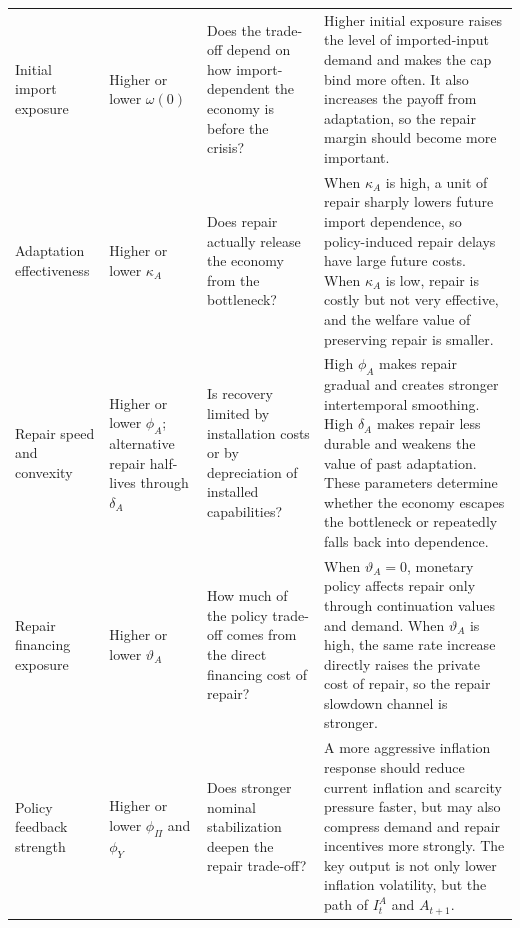 ﻿\documentclass[12pt]{article}
\theoremstyle{remark}
\begin{document}
\begin{longtable}{
>{\raggedright\arraybackslash}p{}
>{\raggedright\arraybackslash}p{}
>{\raggedright\arraybackslash}p{}
>{\raggedright\arraybackslash}p{}}
Initial import exposure
&
Higher or lower $\omega(0)$
&
Does the trade-off depend on how import-dependent the economy is before the crisis?
&
Higher initial exposure raises the level of imported-input demand and makes the cap bind more
often. It also increases the payoff from adaptation, so the repair margin should become more
important.
\\

Adaptation effectiveness
&
Higher or lower $\kappa_A$
&
Does repair actually release the economy from the bottleneck?
&
When $\kappa_A$ is high, a unit of repair sharply lowers future import dependence, so policy-induced
repair delays have large future costs. When $\kappa_A$ is low, repair is costly but not very
effective, and the welfare value of preserving repair is smaller.
\\

Repair speed and convexity
&
Higher or lower $\phi_A$; alternative repair half-lives through $\delta_A$
&
Is recovery limited by installation costs or by depreciation of installed capabilities?
&
High $\phi_A$ makes repair gradual and creates stronger intertemporal smoothing. High $\delta_A$
makes repair less durable and weakens the value of past adaptation. These parameters determine
whether the economy escapes the bottleneck or repeatedly falls back into dependence.
\\

Repair financing exposure
&
Higher or lower $\vartheta_A$
&
How much of the policy trade-off comes from the direct financing cost of repair?
&
When $\vartheta_A=0$, monetary policy affects repair only through continuation values and demand.
When $\vartheta_A$ is high, the same rate increase directly raises the private cost of repair, so
the repair slowdown channel is stronger.
\\

Policy feedback strength
&
Higher or lower $\phi_\Pi$ and $\phi_Y$
&
Does stronger nominal stabilization deepen the repair trade-off?
&
A more aggressive inflation response should reduce current inflation and scarcity pressure faster,
but may also compress demand and repair incentives more strongly. The key output is not only lower
inflation volatility, but the path of $I_t^A$ and $A_{t+1}$.
\\

\end{longtable}
\endgroup
\end{document}
